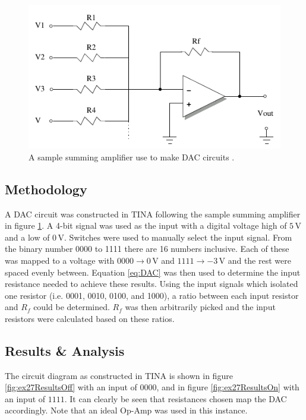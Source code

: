 \documentclass[%
reprint,
amsmath,amssymb,
aps,
floatfix
]{revtex4-2}
\begin{document}
		\begin{figure}
			\includegraphics[width=0.85\columnwidth]{summingAmp.png}
			\caption{\label{fig:summingAmp}A sample summing amplifier use to make DAC circuits \cite{manual}.} 
		\end{figure}
		
		\subsection{Methodology}
		A DAC circuit was constructed in TINA following the sample summing amplifier in figure \ref{fig:summingAmp}. A 4-bit signal was used as the input with a digital voltage high of $5 \,\text{V}$ and a low of $0 \,\text{V}$. Switches were used to manually select the input signal. From the binary number 0000 to 1111 there are 16 numbers inclusive. Each of these was mapped to a voltage with $0000 \to 0 \,\text{V}$ and $1111 \to -3 \,\text{V}$ and the rest were spaced evenly between. Equation \ref{eq:DAC} was then used to determine the input resistance needed to achieve these results. Using the input signals which isolated one resistor (i.e. 0001, 0010, 0100, and 1000), a ratio between each input resistor and $R_f$ could be determined. $R_f$ was then arbitrarily picked and the input resistors were calculated based on these ratios.
		
		\subsection{Results \& Analysis}
		The circuit diagram as constructed in TINA is shown in figure \ref{fig:ex27ResultsOff} with an input of $0000$, and in figure \ref{fig:ex27ResultsOn} with an input of $1111$. It can clearly be seen that resistances chosen map the DAC accordingly. Note that an ideal Op-Amp was used in this instance.
		
\end{document}
